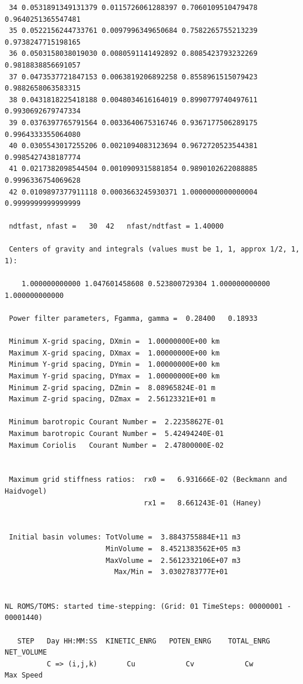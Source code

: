 \begin{verbatim}
 34 0.0531891349131379 0.0115726061288397 0.7060109510479478 0.9640251365547481
 35 0.0522156244733761 0.0097996349650684 0.7582265755213239 0.9738247715198165
 36 0.0503158038019030 0.0080591141492892 0.8085423793232269 0.9818838856691057
 37 0.0473537721847153 0.0063819206892258 0.8558961515079423 0.9882658063583315
 38 0.0431818225418188 0.0048034616164019 0.8990779740497611 0.9930692679747334
 39 0.0376397765791564 0.0033640675316746 0.9367177506289175 0.9964333355064080
 40 0.0305543017255206 0.0021094083123694 0.9672720523544381 0.9985427438187774
 41 0.0217382098544504 0.0010909315881854 0.9890102622088885 0.9996336754069628
 42 0.0109897377911118 0.0003663245930371 1.0000000000000004 0.9999999999999999

 ndtfast, nfast =   30  42   nfast/ndtfast = 1.40000

 Centers of gravity and integrals (values must be 1, 1, approx 1/2, 1, 1):

    1.000000000000 1.047601458608 0.523800729304 1.000000000000 1.000000000000

 Power filter parameters, Fgamma, gamma =  0.28400   0.18933

 Minimum X-grid spacing, DXmin =  1.00000000E+00 km
 Maximum X-grid spacing, DXmax =  1.00000000E+00 km
 Minimum Y-grid spacing, DYmin =  1.00000000E+00 km
 Maximum Y-grid spacing, DYmax =  1.00000000E+00 km
 Minimum Z-grid spacing, DZmin =  8.08965824E-01 m
 Maximum Z-grid spacing, DZmax =  2.56123321E+01 m

 Minimum barotropic Courant Number =  2.22358627E-01
 Maximum barotropic Courant Number =  5.42494240E-01
 Maximum Coriolis   Courant Number =  2.47800000E-02


 Maximum grid stiffness ratios:  rx0 =   6.931666E-02 (Beckmann and Haidvogel)
                                 rx1 =   8.661243E-01 (Haney)


 Initial basin volumes: TotVolume =  3.8843755884E+11 m3
                        MinVolume =  8.4521383562E+05 m3
                        MaxVolume =  2.5612332106E+07 m3
                          Max/Min =  3.0302783777E+01


NL ROMS/TOMS: started time-stepping: (Grid: 01 TimeSteps: 00000001 - 00001440)

   STEP   Day HH:MM:SS  KINETIC_ENRG   POTEN_ENRG    TOTAL_ENRG    NET_VOLUME
          C => (i,j,k)       Cu            Cv            Cw         Max Speed


\end{verbatim}
